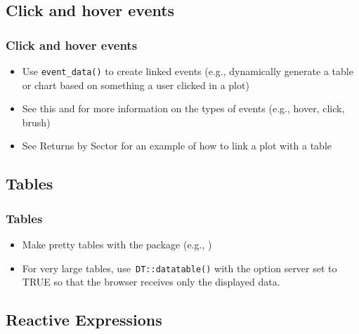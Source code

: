 \documentclass[
	11pt, %
]{beamer}
\begin{document}
\subsection{Click and hover events}

\begin{frame}
	\frametitle{Click and hover events}
	\begin{itemize}
	\item Use \texttt{event\_data()} to create linked events (e.g., dynamically generate a table or chart based on something a user clicked in a plot)
	\item See this \href{https://plotly-r.com/linking-views-with-shiny.html\#shiny-plotly-inputs}{\color{blue}{documentation}} and \href{https://testing-apps.shinyapps.io/plotlyevents/}{\color{blue}{interactive example}} for more information on the types of events (e.g., hover, click, brush)
	\item See Returns by Sector for an example of how to link a plot with a table
	\end{itemize}
\end{frame}

\subsection{Tables}
\begin{frame}
	\frametitle{Tables}
	
	\begin{itemize}
	\item Make pretty tables with the \href{https://glin.github.io/reactable/}{} package (e.g., \href{https://glin.github.io/reactable/articles/womens-world-cup/womens-world-cup.html}{\color{blue}{2019 Women's World Cup Predictions}})
	\item For very large tables, use\texttt{ DT::datatable()} with the option server set to TRUE so that the browser receives only the displayed data.
	\end{itemize}
	
\end{frame}

\subsection{Reactive Expressions}
\end{document}
